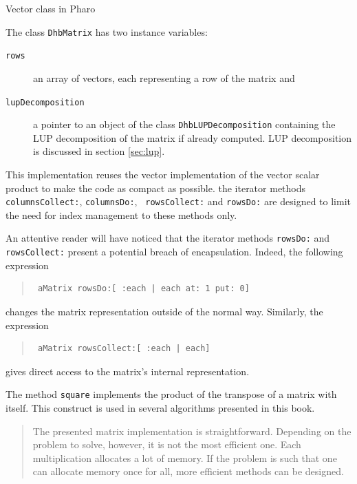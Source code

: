 \documentclass[twoside]{book}
\begin{document}
\begin{listing} Vector class in Pharo \label{ls:vector}

\end{listing}

\noindent The class {\tt DhbMatrix} has two instance variables:
\begin{description}
\item[\tt rows] an array of vectors, each representing a
row of the matrix and
\item[\tt lupDecomposition ] a pointer to an object of the class
{\tt DhbLUPDecomposition} containing the LUP decomposition of the
matrix if already computed. LUP decomposition is discussed in
section \ref{sec:lup}.
\end{description}
This implementation reuses the vector implementation of the vector
scalar product to make the code as compact as possible. the
iterator methods {\tt columnsCollect:}, {\tt columnsDo:}, {\tt
rowsCollect:} and {\tt rowsDo:} are designed to limit the need for
index management to these methods only.

An attentive reader will have noticed that the iterator methods
{\tt rowsDo:} and {\tt rowsCollect:} present a potential breach of
encapsulation. Indeed, the following expression
\begin{quote}
\begin{verbatim}
 aMatrix rowsDo:[ :each | each at: 1 put: 0]
\end{verbatim}
\end{quote}
changes the matrix representation outside of the normal way.
Similarly, the expression
\begin{quote}
\begin{verbatim}
 aMatrix rowsCollect:[ :each | each]
\end{verbatim}
\end{quote}
gives direct access to the matrix's internal representation.

The method {\tt square} implements the product of the transpose of
a matrix with itself. This construct is used in several algorithms
presented in this book.

\begin{quotation}
 The presented matrix implementation is
straightforward. Depending on the problem to solve, however, it is
not the most efficient one. Each multiplication allocates a lot of
memory. If the problem is such that one can allocate memory once
for all, more efficient methods can be designed.
\end{quotation}
\end{document}
